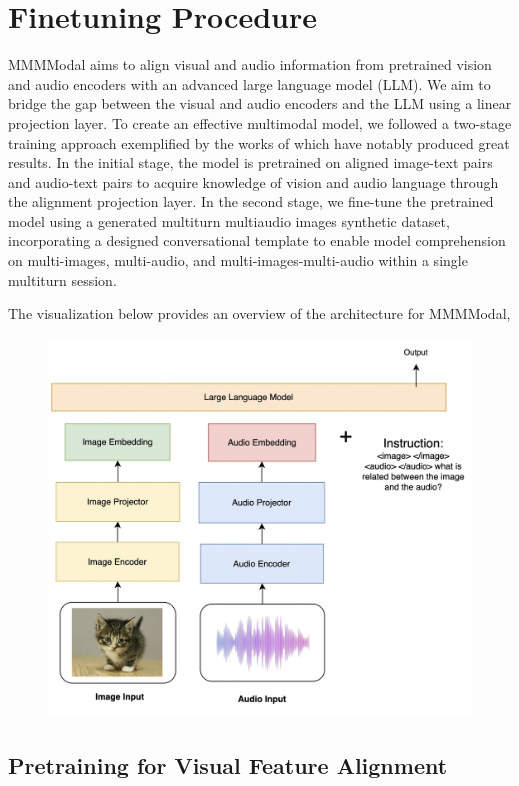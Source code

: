 \documentclass[preprint]{article}
\begin{document}
\section{Finetuning Procedure}

MMMModal aims to align visual and audio information from pretrained vision and audio encoders with an advanced large language model (LLM). We aim to bridge the gap between the visual and audio encoders and the LLM using a linear projection layer. To create an effective multimodal model, we followed a two-stage training approach exemplified by the works of \cite{han2023chartllama,zhu2023minigpt4,liu2024hidden} which have notably produced great results. In the initial stage, the model is pretrained on aligned image-text pairs and audio-text pairs to acquire knowledge of vision and audio language through the alignment projection layer. In the second stage, we fine-tune the pretrained model using a generated multiturn multiaudio images synthetic dataset, incorporating a designed conversational template to enable model comprehension on multi-images, multi-audio, and multi-images-multi-audio within a single multiturn session.

The visualization below provides an overview of the architecture for MMMModal,

\begin{figure}[hbt!]
  \centering
  \includegraphics[width=0.6\linewidth]{pic/overall-architecture.jpg} %
\end{figure}

\subsection{Pretraining for Visual Feature Alignment}\label{sec:visual-alignment}
\end{document}

